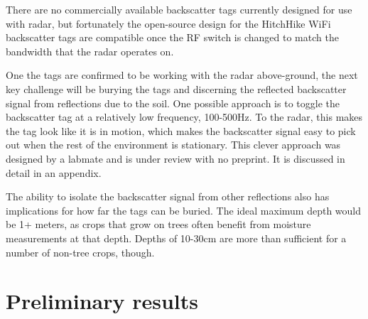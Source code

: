 \documentclass[12pt]{article}
\begin{document}

There are no commercially available backscatter tags currently
designed for use with radar, but fortunately the open-source design
for the HitchHike WiFi backscatter tags are compatible once the RF
switch is changed to match the bandwidth that the radar operates on.

One the tags are confirmed to be working with the radar above-ground,
the next key challenge will be burying the tags and discerning the
reflected backscatter signal from reflections due to the soil. One
possible approach is to toggle the backscatter tag at a relatively low
frequency, 100-500Hz. To the radar, this makes the tag look like it is
in motion, which makes the backscatter signal easy to pick out when
the rest of the environment is stationary. This clever approach was
designed by a labmate and is under review with no preprint. It is
discussed in detail in an appendix.

The ability to isolate the backscatter signal from other reflections
also has implications for how far the tags can be buried. The ideal
maximum depth would be 1+ meters, as crops that grow on trees often
benefit from moisture measurements at that depth. Depths of 10-30cm
are more than sufficient for a number of non-tree crops, though.



\section*{Preliminary results} 
\end{document}
